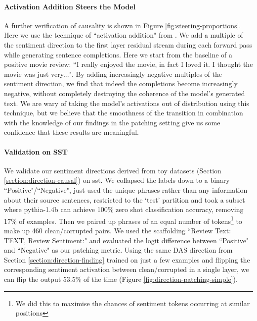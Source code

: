 \documentclass{article} %
\newcommand{\tokens}{\fontfamily{qhv}\selectfont \footnotesize}
\begin{document}
\paragraph{Activation Addition Steers the Model} A further verification of causality is shown in Figure \ref{fig:steering-proportions}. Here we use the technique of ``\gls{activation addition}" from \citet{turner2023activation}. We add a multiple of the sentiment direction to the first layer residual stream during each forward pass while generating sentence completions. Here we start from the baseline of a positive movie review: {\tokens ``I really enjoyed the movie, in fact I loved it. I thought the movie was just very..."}. By adding increasingly negative multiples of the sentiment direction, we find that indeed the completions become increasingly negative, without completely destroying the coherence of the model's generated text. We are wary of taking the model's activations out of distribution using this technique, but we believe that the smoothness of the transition in combination with the knowledge of our findings in the patching setting give us some confidence that these results are meaningful.
\paragraph{Validation on SST} We validate our sentiment directions derived from toy datasets (Section \ref{section:direction-causal}) on \gls{sst}. We collapsed the labels down to a binary ``Positive"/``Negative", just used the unique phrases rather than any information about their source sentences, restricted to the `test' partition and took a subset where pythia-1.4b can achieve 100\% zero shot classification accuracy, removing 17\% of examples. Then we paired up phrases of an equal number of tokens\footnote{We did this to maximise the chances of sentiment tokens occurring at similar positions} to make up 460 clean/corrupted pairs.
We used the scaffolding {\tokens ``Review Text: TEXT, Review Sentiment:"} and evaluated the logit difference between {\tokens ``Positive"} and {\tokens ``Negative"} as our \gls{patching metric}. Using the same DAS direction from Section \ref{section:direction-finding} trained on just a few examples and flipping the corresponding sentiment activation between clean/corrupted in a single layer, we can flip the output 53.5\% of the time (Figure \ref{fig:direction-patching-simple}).
\end{document}
